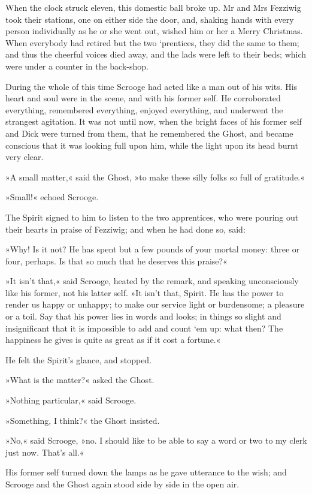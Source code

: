 When the clock struck eleven, this domestic ball broke up. Mr and Mrs Fezziwig took their stations, one on either side the door, and, shaking hands with every person individually as he or she went out, wished him or her a Merry Christmas. When everybody had retired but the two `prentices, they did the same to them; and thus the cheerful voices died away, and the lads were left to their beds; which were under a counter in the back-shop.

During the whole of this time Scrooge had acted like a man out of his wits. His heart and soul were in the scene, and with his former self. He corroborated everything, remembered everything, enjoyed everything, and underwent the strangest agitation. It was not until now, when the bright faces of his former self and Dick were turned from them, that he remembered the Ghost, and became conscious that it was looking full upon him, while the light upon its head burnt very clear.

»A small matter,« said the Ghost, »to make these silly folks so full of gratitude.«

»Small!« echoed Scrooge.

The Spirit signed to him to listen to the two apprentices, who were pouring out their hearts in praise of Fezziwig; and when he had done so, said:

»Why! Is it not? He has spent but a few pounds of your mortal money: three or four, perhaps. Is that so much that he deserves this praise?«

»It isn't that,« said Scrooge, heated by the remark, and speaking unconsciously like his former, not his latter self. »It isn't that, Spirit. He has the power to render us happy or unhappy; to make our service light or burdensome; a pleasure or a toil. Say that his power lies in words and looks; in things so slight and insignificant that it is impossible to add and count `em up: what then? The happiness he gives is quite as great as if it cost a fortune.«

He felt the Spirit's glance, and stopped.

»What is the matter?« asked the Ghost.

»Nothing particular,« said Scrooge.

»Something, I think?« the Ghost insisted.

»No,« said Scrooge, »no. I should like to be able to say a word or two to my clerk just now. That's all.«

His former self turned down the lamps as he gave utterance to the wish; and Scrooge and the Ghost again stood side by side in the open air.

